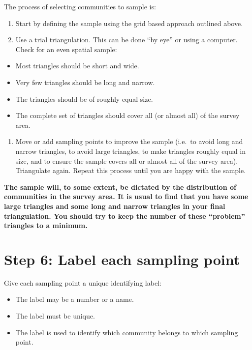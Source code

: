 \documentclass[12pt,a4paper]{book}
\providecommand{\tightlist}{%
  \setlength{\itemsep}{0pt}\setlength{\parskip}{0pt}}
\theoremstyle{definition}
\theoremstyle{definition}
\theoremstyle{definition}
\theoremstyle{remark}
\begin{document}
The process of selecting communities to sample is:

\begin{enumerate}
\def\labelenumi{\arabic{enumi}.}
\item
  Start by defining the sample using the grid based approach outlined
  above.
\item
  Use a trial triangulation. This can be done ``by eye'' or using a
  computer. Check for an even spatial sample:
\end{enumerate}

\begin{itemize}
\item
  Most triangles should be short and wide.
\item
  Very few triangles should be long and narrow.
\item
  The triangles should be of roughly equal size.
\item
  The complete set of triangles should cover all (or almost all) of the
  survey area.
\end{itemize}

\begin{enumerate}
\def\labelenumi{\arabic{enumi}.}
\setcounter{enumi}{2}
\tightlist
\item
  Move or add sampling points to improve the sample (i.e.~to avoid long
  and narrow triangles, to avoid large triangles, to make triangles
  roughly equal in size, and to ensure the sample covers all or almost
  all of the survey area). Triangulate again. Repeat this process until
  you are happy with the sample.
\end{enumerate}

\textbf{The sample will, to some extent, be dictated by the distribution
of communities in the survey area. It is usual to find that you have
some large triangles and some long and narrow triangles in your final
triangulation. You should try to keep the number of these ``problem''
triangles to a minimum.}

\newpage

\hypertarget{step-6-label-each-sampling-point}{%
\section{Step 6: Label each sampling
point}\label{step-6-label-each-sampling-point}}

Give each sampling point a unique identifying label:

\begin{itemize}
\item
  The label may be a number or a name.
\item
  The label must be unique.
\item
  The label is used to identify which community belongs to which
  sampling point.
\end{itemize}
\end{document}

